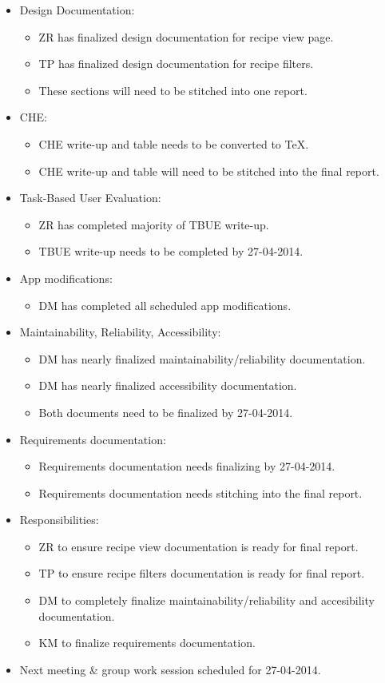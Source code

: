 \documentclass{article}
\begin{document}
\begin{itemize}
\item Design Documentation:
  \begin{itemize}
  \item ZR has finalized design documentation for recipe view page.
  \item TP has finalized design documentation for recipe filters.
  \item These sections will need to be stitched into one report.
  \end{itemize}
\item CHE:
  \begin{itemize}
  \item CHE write-up and table needs to be converted to TeX.
  \item CHE write-up and table will need to be stitched into the final report.
  \end{itemize}
\item Task-Based User Evaluation:
  \begin{itemize}
  \item ZR has completed majority of TBUE write-up.
  \item TBUE write-up needs to be completed by 27-04-2014.
  \end{itemize}
\item App modifications:
  \begin{itemize}
  \item DM has completed all scheduled app modifications.
  \end{itemize}
\item Maintainability, Reliability, Accessibility:
  \begin{itemize}
  \item DM has nearly finalized maintainability/reliability documentation.
  \item DM has nearly finalized accessibility documentation.
  \item Both documents need to be finalized by 27-04-2014.
  \end{itemize}
\item Requirements documentation:
  \begin{itemize}
  \item Requirements documentation needs finalizing by 27-04-2014.
  \item Requirements documentation needs stitching into the final report.
  \end{itemize}
\item Responsibilities:
  \begin{itemize}
  \item ZR to ensure recipe view documentation is ready for final report.
  \item TP to ensure recipe filters documentation is ready for final report.
  \item DM to completely finalize maintainability/reliability and accesibility documentation.
  \item KM to finalize requirements documentation.
  \end{itemize}
\item Next meeting \& group work session scheduled for 27-04-2014.
\end{itemize}
\end{document}
